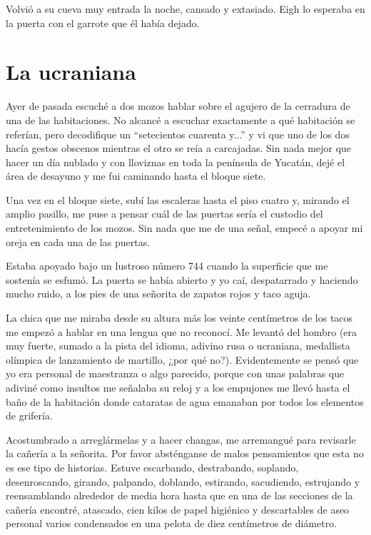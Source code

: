 \documentclass[11pt,twoside,openright,a6paper]{book}
\begin{document}
Volvió a su cueva muy entrada la noche, cansado y extasiado. Eigh lo esperaba en la puerta con el garrote que él había dejado.

\chapter*{La ucraniana}


Ayer de pasada escuché a dos mozos hablar sobre el agujero de la cerradura de
una de las habitaciones. No alcancé a escuchar exactamente a qué habitación
se referían, pero decodifique un “setecientos cuarenta y...” y vi que uno
de los dos hacía gestos obscenos mientras el otro se reía a carcajadas. Sin
nada mejor que hacer un día nublado y con lloviznas en toda la península de
Yucatán, dejé el área de desayuno y me fui caminando hasta el bloque siete.

Una vez en el bloque siete, subí las escaleras hasta el piso cuatro y,
mirando el amplio pasillo, me puse a pensar cuál de las puertas sería el
custodio del entretenimiento de los mozos. Sin nada que me de una señal,
empecé a apoyar mi oreja en cada una de las puertas.

Estaba apoyado bajo un lustroso número 744 cuando la superficie que me
sostenía se esfumó. La puerta se había abierto y yo caí, despatarrado
y haciendo mucho ruido, a los pies de una señorita de zapatos rojos y
taco aguja.

La chica que me miraba desde su altura más los veinte centímetros de
los tacos me empezó a hablar en una lengua que no reconocí. Me levantó
del hombro (era muy fuerte, sumado a la pista del idioma, adivino rusa o
ucraniana, medallista olímpica de lanzamiento de martillo, ¿por qué
no?). Evidentemente se pensó que yo era personal de maestranza o algo
parecido, porque con unas palabras que adiviné como insultos me señalaba
su reloj y a los empujones me llevó hasta el baño de la habitación donde
cataratas de agua emanaban por todos los elementos de grifería.

  Acostumbrado a
arreglármelas y a hacer changas, me arremangué para revisarle la cañería a
la señorita. Por favor absténganse de malos pensamientos que esta no es ese
tipo de historias. Estuve escarbando, destrabando, soplando, desenroscando,
girando, palpando, doblando, estirando, sacudiendo, estrujando y reensamblando
alrededor de media hora hasta que en una de las secciones de la cañería
encontré, atascado, cien kilos de papel higiénico y descartables de aseo
personal varios condensados en una pelota de diez centímetros de diámetro.
\end{document}
